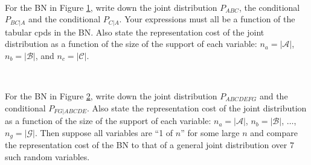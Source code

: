 ~

\begin{Exercise}[label=ABC]
For the BN in Figure \ref{fig:exBN1}, write down the joint distribution $P_{ABC}$, the conditional $P_{BC|A}$ and the conditional $P_{C|A}$. Your expressions must all be a function of the tabular cpds in the BN. 
Also state the representation cost of the joint distribution as a function of the size of the support of each variable: $n_a = |\mathcal A|$, $n_b = |\mathcal B|$, and $n_c = |\mathcal C|$. %
\begin{figure}[h]\centering
	\caption{\label{fig:exBN1}}
\end{figure}
\end{Exercise}

		
~

\begin{Exercise}[label=A-G]
For the BN in Figure \ref{fig:exBN2}, write down the joint distribution $P_{ABCDEFG}$ and the conditional $P_{FG|ABCDE}$. 
Also state the representation cost of the joint distribution as a function of the size of the support of each variable: $n_a = |\mathcal A|$, $n_b = |\mathcal B|$, $\ldots$, $n_g = |\mathcal G|$. 
Then suppose all variables are ``1 of $n$'' for some large $n$ and compare the representation cost of the BN to that of a general joint distribution over $7$ such random variables.
\begin{figure}[h]\centering
	\caption{\label{fig:exBN2}}
\end{figure}
\end{Exercise}

\newpage
		
